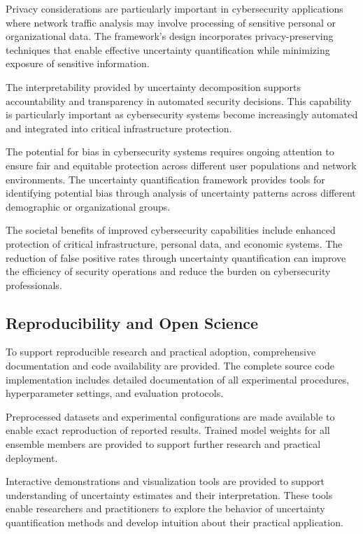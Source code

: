 \documentclass[journal]{IEEEtran}
\begin{document}
Privacy considerations are particularly important in cybersecurity applications where network traffic analysis may involve processing of sensitive personal or organizational data. The framework's design incorporates privacy-preserving techniques that enable effective uncertainty quantification while minimizing exposure of sensitive information.

The interpretability provided by uncertainty decomposition supports accountability and transparency in automated security decisions. This capability is particularly important as cybersecurity systems become increasingly automated and integrated into critical infrastructure protection.

The potential for bias in cybersecurity systems requires ongoing attention to ensure fair and equitable protection across different user populations and network environments. The uncertainty quantification framework provides tools for identifying potential bias through analysis of uncertainty patterns across different demographic or organizational groups.

The societal benefits of improved cybersecurity capabilities include enhanced protection of critical infrastructure, personal data, and economic systems. The reduction of false positive rates through uncertainty quantification can improve the efficiency of security operations and reduce the burden on cybersecurity professionals.

\subsection{Reproducibility and Open Science}

To support reproducible research and practical adoption, comprehensive documentation and code availability are provided. The complete source code implementation includes detailed documentation of all experimental procedures, hyperparameter settings, and evaluation protocols.

Preprocessed datasets and experimental configurations are made available to enable exact reproduction of reported results. Trained model weights for all ensemble members are provided to support further research and practical deployment.

Interactive demonstrations and visualization tools are provided to support understanding of uncertainty estimates and their interpretation. These tools enable researchers and practitioners to explore the behavior of uncertainty quantification methods and develop intuition about their practical application.
\end{document}
